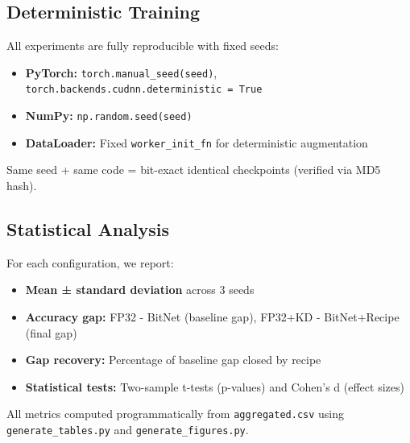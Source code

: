 \subsection{Deterministic Training}

All experiments are fully reproducible with fixed seeds:
\begin{itemize}
    \item \textbf{PyTorch:} \texttt{torch.manual\_seed(seed)}, \texttt{torch.backends.cudnn.deterministic = True}
    \item \textbf{NumPy:} \texttt{np.random.seed(seed)}
    \item \textbf{DataLoader:} Fixed \texttt{worker\_init\_fn} for deterministic augmentation
\end{itemize}

Same seed + same code = bit-exact identical checkpoints (verified via MD5 hash).

\subsection{Statistical Analysis}

For each configuration, we report:
\begin{itemize}
    \item \textbf{Mean ± standard deviation} across 3 seeds
    \item \textbf{Accuracy gap:} FP32 - BitNet (baseline gap), FP32+KD - BitNet+Recipe (final gap)
    \item \textbf{Gap recovery:} Percentage of baseline gap closed by recipe
    \item \textbf{Statistical tests:} Two-sample t-tests (p-values) and Cohen's d (effect sizes)
\end{itemize}

All metrics computed programmatically from \texttt{aggregated.csv} using \texttt{generate\_tables.py} and \texttt{generate\_figures.py}.
